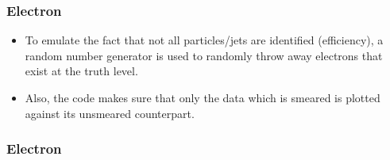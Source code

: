\documentclass[•]{beamer}
\theoremstyle{remark}
\begin{document}
\begin{frame}\frametitle{Electron}
\begin{block}

\begin{itemize}
\item To emulate the fact that not all particles/jets are identified (efficiency), a random number generator is used to randomly throw away electrons that exist at the truth level.
\item Also, the code makes sure that only the data which is smeared is plotted against its unsmeared counterpart. 
\end{itemize}
\end{block}
\end{frame}
\begin{frame}[shrink=20]\frametitle{Electron}
\begin{block}


\end{block}
\end{frame}
\end{document}
